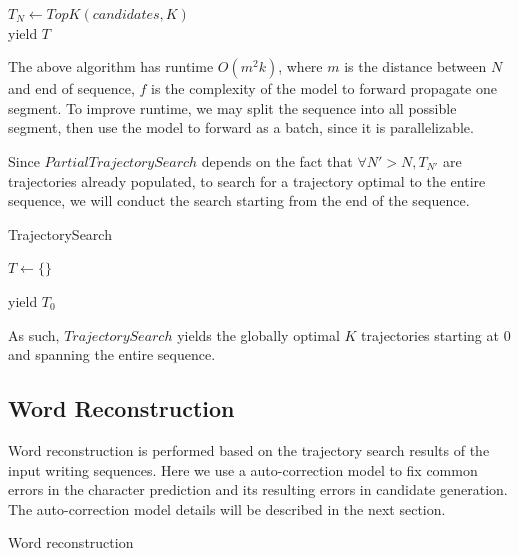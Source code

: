 \documentclass{article}
\begin{document}
\begin{multicols*}{2}
\begin{algorithm}[H]
$T_N \gets TopK(candidates, K)$\\
yield $T$
\end{algorithm}

The above algorithm has runtime $O(m^2 k)$, where $m$ is the distance between $N$ and end of sequence, $f$ is the complexity of the model to forward propagate one segment. To improve runtime, we may split the sequence into all possible segment, then use the model to forward as a batch, since it is parallelizable. 

Since $PartialTrajectorySearch$ depends on the fact that $\forall N' > N, T_{N'} $ are trajectories already populated, to search for a trajectory optimal to the entire sequence, we will conduct the search starting from the end of the sequence.

\begin{algorithm}[H]
\SetAlgoLined
\caption{TrajectorySearch}

$T \gets \{\}$


yield $T_0$
\end{algorithm}

As such, $TrajectorySearch$ yields the globally optimal $K$ trajectories starting at $0$ and spanning the entire sequence. 

\subsection{Word Reconstruction}

Word reconstruction is performed based on the trajectory search results of the input writing sequences. Here we use a auto-correction model to fix common errors in the character prediction and its resulting errors in candidate generation. The auto-correction model details will be described in the next section.

\begin{algorithm}[H]
\SetAlgoLined
\caption{Word reconstruction}
  


\end{algorithm}
\end{multicols*}
\end{document}
